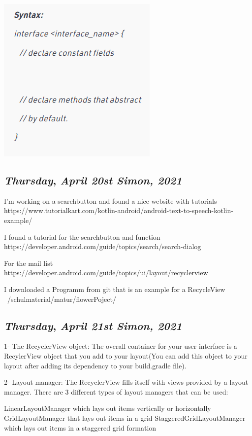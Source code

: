 \includegraphics[width=.4\textwidth]{media/SyntactsInterface.png}


\def\day{\textit{April 20st Simon, 2021}}
\def\weekday{\textit{Thursday}}
\subsection*{\weekday, \day}

I'm working on a searchbutton and found a nice website with tutorials
https://www.tutorialkart.com/kotlin-android/android-text-to-speech-kotlin-example/

I found a tutorial for the searchbutton and function
https://developer.android.com/guide/topics/search/search-dialog

For the mail list
https://developer.android.com/guide/topics/ui/layout/recyclerview

I downloaded a Programm from git that is an example for a RecycleView
~/schulmaterial/matur/flowerPoject/



\def\day{\textit{April 21st Simon, 2021}}
\def\weekday{\textit{Thursday}}
\subsection*{\weekday, \day}


1- The RecyclerView object: The overall container for your user interface is a RecylerView object that you add to your layout(You can add this object to your layout after adding its dependency to your build.gradle file).

2- Layout manager: The RecyclerView fills itself with views provided by a layout manager. There are 3 different types of layout managers that can be used:

    LinearLayoutManager which lays out items vertically or horizontally
    GridLayoutManager that lays out items in a grid
    StaggeredGridLayoutManager which lays out items in a staggered grid formation

